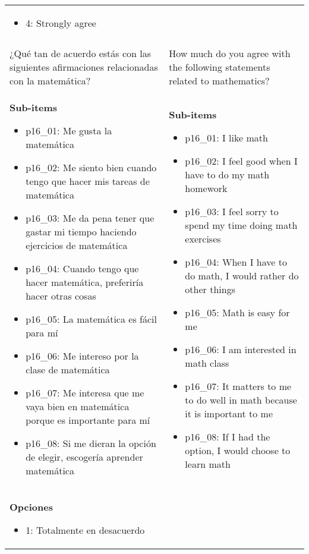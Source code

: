 \documentclass[11pt]{article}
\begin{document}
\begin{longtable}{@{}LL@{}}
\begin{itemize}[leftmargin=*]
\item 4: Strongly agree\end{itemize} \\
\addlinespace[4pt]
 \\ 
¿Qué tan de acuerdo estás con las siguientes afirmaciones relacionadas con la matemática? & How much do you agree with the following statements related to mathematics? \\
\textbf{Sub-items}\par\begin{itemize}[leftmargin=*]\item p16\_01: Me gusta la matemática
\item p16\_02: Me siento bien cuando tengo que hacer mis tareas de matemática
\item p16\_03: Me da pena tener que gastar mi tiempo haciendo ejercicios de matemática
\item p16\_04: Cuando tengo que hacer matemática, preferiría hacer otras cosas
\item p16\_05: La matemática es fácil para mí
\item p16\_06: Me intereso por la clase de matemática
\item p16\_07: Me interesa que me vaya bien en matemática porque es importante para mí
\item p16\_08: Si me dieran la opción de elegir, escogería aprender matemática\end{itemize} & \textbf{Sub-items}\par\begin{itemize}[leftmargin=*]\item p16\_01: I like math
\item p16\_02: I feel good when I have to do my math homework
\item p16\_03: I feel sorry to spend my time doing math exercises
\item p16\_04: When I have to do math, I would rather do other things
\item p16\_05: Math is easy for me
\item p16\_06: I am interested in math class
\item p16\_07: It matters to me to do well in math because it is important to me
\item p16\_08: If I had the option, I would choose to learn math\end{itemize} \\
\textbf{Opciones}\par\begin{itemize}[leftmargin=*]\item 1: Totalmente en desacuerdo

\end{itemize}
\end{longtable}
\end{document}
